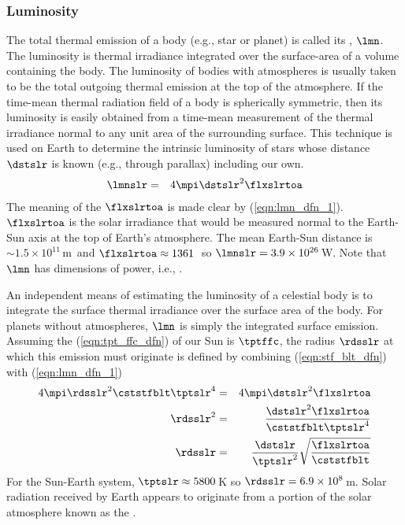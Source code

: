 \documentclass[12pt]{article}
\begin{document}
\subsubsection[Luminosity]{Luminosity}\label{sxn:lmn}
The total thermal emission of a body (e.g., star or planet) is called  
its , $\lmn$.
The luminosity is thermal irradiance integrated over the surface-area
of a volume containing the body.
The luminosity of bodies with atmospheres is usually taken to be
the total outgoing thermal emission at the top of the atmosphere.
If the time-mean thermal radiation field of a body is spherically
symmetric, then its luminosity is easily obtained from a time-mean
measurement of the thermal irradiance normal to any unit area of the
surrounding surface.
This technique is used on Earth to determine the intrinsic luminosity
of stars whose distance $\dstslr$ is known (e.g., through parallax)
including our own.
\begin{eqnarray}
\lmnslr & = & 4\mpi\dstslr^{2} \flxslrtoa
\label{eqn:lmn_dfn_1}
\end{eqnarray}
The meaning of the  $\flxslrtoa$ is made clear
by (\ref{eqn:lmn_dfn_1}).
$\flxslrtoa$ is the solar irradiance that would be measured normal to
the Earth-Sun axis at the top of Earth's atmosphere.
The mean Earth-Sun distance is $\sim 1.5 \times 10^{11}$\,m\ and 
$\flxslrtoa \approx 1361$\,\wxmS\ so 
$\lmnslr = 3.9 \times 10^{26}$\,W.
Note that $\lmn$ has dimensions of power, i.e., \jxs.

An independent means of estimating the luminosity of a celestial body 
is to integrate the surface thermal irradiance over the surface area
of the body.
For planets without atmospheres, $\lmn$ is simply the integrated
surface emission. 
Assuming the  (\ref{eqn:tpt_ffc_dfn}) of
our Sun is $\tptffc$, the radius $\rdsslr$ at which this emission must
originate is defined by combining (\ref{eqn:stf_blt_dfn}) with
(\ref{eqn:lmn_dfn_1})
\begin{eqnarray}
4\mpi\rdsslr^{2} \cststfblt \tptslr^{4} & = & 4\mpi\dstslr^{2} \flxslrtoa 
\nonumber \\
\rdsslr^{2} & = & \frac{\dstslr^{2} \flxslrtoa}{\cststfblt \tptslr^{4}} 
\nonumber \\
\rdsslr & = &
\frac{\dstslr}{\tptslr^{2}}\sqrt{\frac{\flxslrtoa}{\cststfblt}} 
\label{eqn:rds_slr_dfn}
\end{eqnarray}
For the Sun-Earth system, $\tptslr \approx 5800$\,K so
$\rdsslr = 6.9 \times 10^{8}$\,m. 
Solar radiation received by Earth appears to originate from a portion
of the solar atmosphere known as the . 
\end{document}
